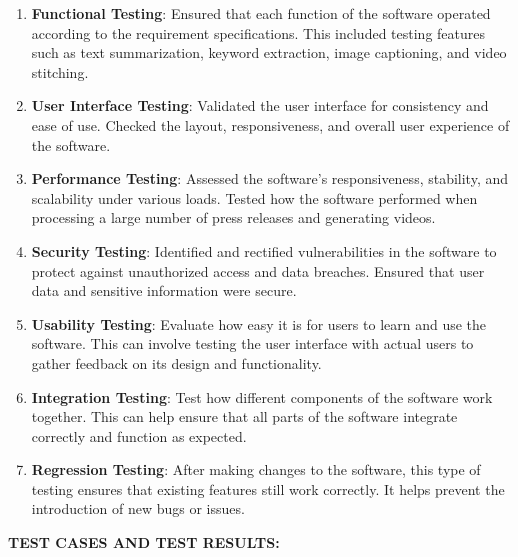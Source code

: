 \documentclass[12pt]{article}
\begin{document}
\begin{enumerate}
    \item \textbf{Functional Testing}: Ensured that each function of the software operated according to the requirement specifications. This included testing features such as text summarization, keyword extraction, image captioning, and video stitching.
\item \textbf{User Interface Testing}: Validated the user interface for consistency and ease of use. Checked the layout, responsiveness, and overall user experience of the software.
\item \textbf{Performance Testing}: Assessed the software's responsiveness, stability, and scalability under various loads. Tested how the software performed when processing a large number of press releases and generating videos.
\item \textbf{Security Testing}: Identified and rectified vulnerabilities in the software to protect against unauthorized access and data breaches. Ensured that user data and sensitive information were secure.
\item \textbf{Usability Testing}: Evaluate how easy it is for users to learn and use the software. This can involve testing the user interface with actual users to gather feedback on its design and functionality.
\item \textbf{Integration Testing}: Test how different components of the software work together. This can help ensure that all parts of the software integrate correctly and function as expected.
\item \textbf{Regression Testing}: After making changes to the software, this type of testing ensures that existing features still work correctly. It helps prevent the introduction of new bugs or issues.

\end{enumerate}
\bigskip
\justify \textbf{\fontsize{12}{12} TEST CASES AND TEST RESULTS: }
\end{document}
